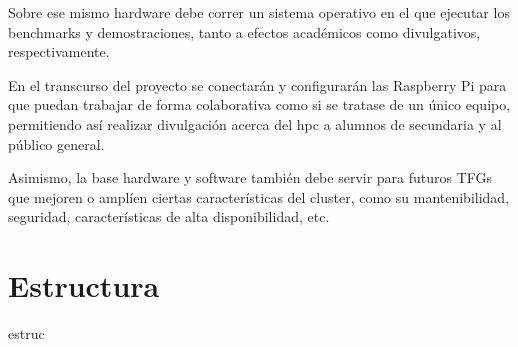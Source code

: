 Sobre ese mismo hardware debe correr un sistema operativo en el que ejecutar los benchmarks y demostraciones, tanto a efectos académicos como divulgativos, respectivamente.

En el transcurso del proyecto se conectarán y configurarán las Raspberry Pi para que puedan trabajar de forma colaborativa como si se tratase de un único equipo, permitiendo así realizar divulgación acerca del \acrshort{hpc} a alumnos de secundaria y al público general.

Asimismo, la base hardware y software también debe servir para futuros TFGs que mejoren o amplíen ciertas características del cluster, como su mantenibilidad, seguridad, características de alta disponibilidad, etc.



\section{Estructura}
\label{sec:estructura}

estruc
